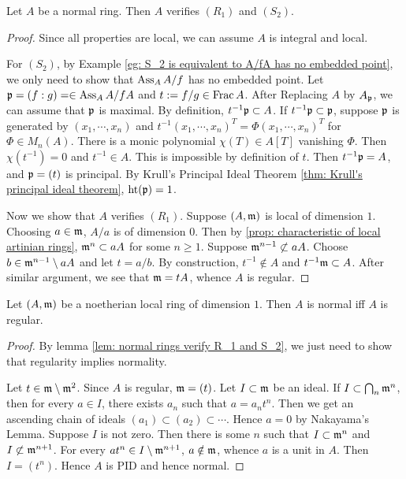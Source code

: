     \begin{lemma}\label{lem: normal rings verify R_1 and S_2}
        Let $A$ be a normal ring.
        Then $A$ verifies $(R_1)$ and $(S_2)$.
    \end{lemma}
    \begin{proof}
        Since all properties are local, we can assume $A$ is integral and local.

        For $(S_2)$, by Example \ref{eg: S_2 is equivalent to A/fA has no embedded point}, we only need to show that $\operatorname{Ass}_A A/f$ has no embedded point.
        Let ${\mathfrak{p}} = (f:g) = \in \operatorname{Ass}_A A/fA$ and $t:= f/g \in \operatorname{Frac} A$.
        After Replacing $A$ by $A_{\mathfrak{p}}$, we can assume that ${\mathfrak{p}}$ is maximal.
        By definition, $t^{-1}{\mathfrak{p}} \subset A$.
        If $t^{-1}{\mathfrak{p}} \subset {\mathfrak{p}}$, suppose ${\mathfrak{p}}$ is generated by $(x_1,\cdots,x_n)$ and $t^{-1}(x_1,\cdots,x_n)^T = \Phi(x_1,\cdots,x_n)^T$ for $\Phi \in M_n(A)$.
        There is a monic polynomial $\chi(T) \in A[T]$ vanishing $\Phi$.
        Then $\chi(t^{-1}) = 0$ and $t^{-1} \in A$.
        This is impossible by definition of $t$.
        Then $t^{-1}{\mathfrak{p}} = A$, and ${\mathfrak{p}} = (t)$ is principal. 
        By Krull's Principal Ideal Theorem \ref{thm: Krull's principal ideal theorem}, $\operatorname{ht}({\mathfrak{p}}) = 1$.

        Now we show that $A$ verifies $(R_1)$.
        Suppose $(A, {\mathfrak{m}})$ is local of dimension $1$.
        Choosing $a \in {\mathfrak{m}}$, $A/a$ is of dimension $0$.
        Then by \ref{prop: characteristic of local artinian rings}, ${\mathfrak{m}}^n \subset aA$ for some $n\geq 1$.
        Suppose ${\mathfrak{m}}^{n-1} \not\subset aA$.
        Choose $b \in {\mathfrak{m}}^{n-1} \setminus aA$ and let $t = a/b$.
        By construction, $t^{-1} \notin A$ and $t^{-1}{\mathfrak{m}} \subset A$.
        After similar argument, we see that ${\mathfrak{m}} = tA$, whence $A$ is regular.
    \end{proof}

    \begin{lemma}\label{lem: normal and regular are equivalent for noetherian rings of dimension 1}
        Let $(A,{\mathfrak{m}})$ be a noetherian local ring of dimension $1$.
        Then $A$ is normal iff $A$ is regular.
    \end{lemma}
    \begin{proof}
        By lemma \ref{lem: normal rings verify R_1 and S_2}, we just need to show that regularity implies normality.

        Let $t \in {\mathfrak{m}}\setminus {\mathfrak{m}}^2$.
        Since $A$ is regular, ${\mathfrak{m}} = (t)$.
        Let $I \subset {\mathfrak{m}}$ be an ideal.
        If $I \subset \bigcap_{n} {\mathfrak{m}}^n$, then for every $a \in I$, there exists $a_n$ such that $a = a_n t^n$.
        Then we get an ascending chain of ideals $(a_1) \subset (a_2) \subset \cdots$.
        Hence $a=0$ by Nakayama's Lemma.
        Suppose $I$ is not zero.
        Then there is some $n$ such that $I \subset {\mathfrak{m}}^n$ and $I \not\subset {\mathfrak{m}}^{n+1}$.
        For every $at^n \in I \setminus {\mathfrak{m}}^{n+1}$,  $a \notin {\mathfrak{m}}$, whence $a$ is a unit in $A$.
        Then $I = (t^n)$.
        Hence $A$ is PID and hence normal.
    \end{proof}

